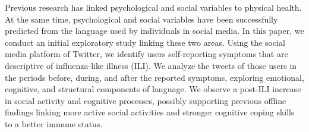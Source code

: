 Previous research has linked psychological and social variables to physical health. At the same time, psychological and social variables have been successfully predicted from the language used by individuals in social media. In this paper, we conduct an initial exploratory study linking these two areas. Using the social media platform of Twitter, we identify users self-reporting symptoms that are descriptive of influenza-like illness (ILI). We analyze the tweets of those users in the periods before, during, and after the reported symptoms, exploring emotional, cognitive, and structural components of language. We observe a post-ILI increase in social activity and cognitive processes, possibly supporting previous offline findings linking more active social activities and stronger cognitive coping skills to a better immune status.

